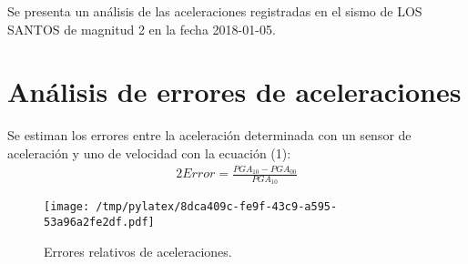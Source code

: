 \documentclass{article}%
\begin{document}
%
\normalsize%
Se presenta un análisis de las aceleraciones registradas en el sismo de LOS SANTOS de magnitud 2 en la fecha 2018{-}01{-}05.\newline%
\section{Análisis de errores de aceleraciones}%
\label{sec:Anlisis de errores de aceleraciones}%
Se estiman los errores entre la aceleración determinada con un sensor de aceleración y uno de velocidad\newline%
                       con la ecuación (1):%
\begin{alignat}{2}%
Error=\frac{PGA_{10}-PGA_{00}}{PGA_{10}} %
\end{alignat}%


\begin{figure}[htbp]%
\centering%
\texttt{[image: /tmp/pylatex/8dca409c-fe9f-43c9-a595-53a96a2fe2df.pdf]}%
\caption{Errores relativos de aceleraciones.}%
\end{figure}

%
\end{document}
